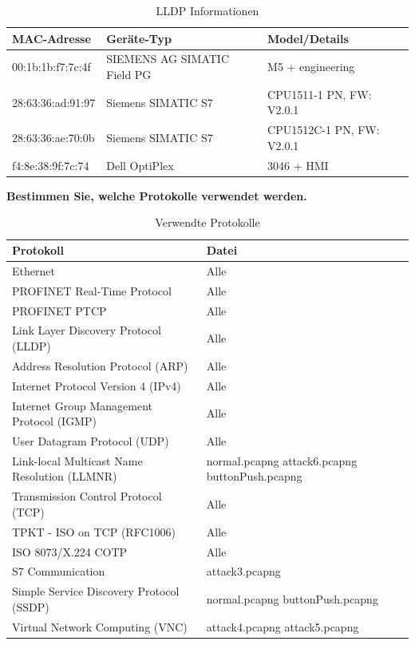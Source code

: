 \documentclass[
    a4paper,
    pagesize,
	pdftex,
    12pt,
]{scrartcl}
\begin{document}
\begin{table}[H]
    \centering
    \begin{tabular}{|l|l|l|}
    \hline
    \textbf{MAC-Adresse} & \textbf{Geräte-Typ} & \textbf{Model/Details} \\
    \hline
    00:1b:1b:f7:7c:4f & SIEMENS AG SIMATIC Field PG & M5 + engineering \\
    28:63:36:ad:91:97 & Siemens SIMATIC S7 & CPU1511-1 PN, FW: V2.0.1 \\
    28:63:36:ae:70:0b & Siemens SIMATIC S7 & CPU1512C-1 PN, FW: V2.0.1 \\
    f4:8e:38:9f:7c:74 & Dell OptiPlex & 3046 + HMI \\
    \hline
    \end{tabular}
    \caption{LLDP Informationen}
    \label{tab:ws-lldp-info}
\end{table}


\textbf{Bestimmen Sie, welche Protokolle verwendet werden.}

\begin{table}[H]
    \centering
    \begin{tabular}{|l|p{5cm}|}
    \hline
    \textbf{Protokoll} & \textbf{Datei} \\
    \hline
    Ethernet & Alle \\
    PROFINET Real-Time Protocol & Alle \\
    PROFINET PTCP & Alle \\
    Link Layer Discovery Protocol (LLDP) & Alle \\
    Address Resolution Protocol (ARP) & Alle \\
    Internet Protocol Version 4 (IPv4) & Alle \\
    Internet Group Management Protocol (IGMP) & Alle \\
    User Datagram Protocol (UDP) & Alle \\
    Link-local Multicast Name Resolution (LLMNR) & normal.pcapng\newline
    attack6.pcapng\newline
    buttonPush.pcapng \\
    Transmission Control Protocol (TCP) & Alle \\
    TPKT - ISO on TCP (RFC1006) & Alle \\
    ISO 8073/X.224 COTP & Alle \\
    S7 Communication & attack3.pcapng \\
    Simple Service Discovery Protocol (SSDP) & normal.pcapng\newline
    buttonPush.pcapng \\
    Virtual Network Computing (VNC) & attack4.pcapng\newline
    attack5.pcapng \\
    \hline
    \end{tabular}
    \caption{Verwendte Protokolle}
    \label{tab:ws-used-protocols}
\end{table}
\end{document}
